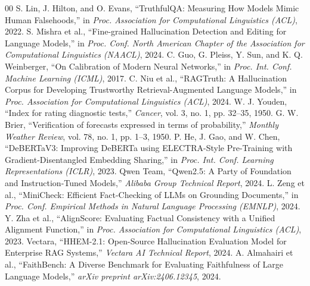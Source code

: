\documentclass[conference]{IEEEtran}
\begin{document}
\begin{thebibliography}{00}
 S. Lin, J. Hilton, and O. Evans, ``TruthfulQA: Measuring How Models Mimic Human Falsehoods,'' in \textit{Proc. Association for Computational Linguistics (ACL)}, 2022.
 S. Mishra et al., ``Fine-grained Hallucination Detection and Editing for Language Models,'' in \textit{Proc. Conf. North American Chapter of the Association for Computational Linguistics (NAACL)}, 2024.
 C. Guo, G. Pleiss, Y. Sun, and K. Q. Weinberger, ``On Calibration of Modern Neural Networks,'' in \textit{Proc. Int. Conf. Machine Learning (ICML)}, 2017.
 C. Niu et al., ``RAGTruth: A Hallucination Corpus for Developing Trustworthy Retrieval-Augmented Language Models,'' in \textit{Proc. Association for Computational Linguistics (ACL)}, 2024.
 W. J. Youden, ``Index for rating diagnostic tests,'' \textit{Cancer}, vol. 3, no. 1, pp. 32--35, 1950.
 G. W. Brier, ``Verification of forecasts expressed in terms of probability,'' \textit{Monthly Weather Review}, vol. 78, no. 1, pp. 1--3, 1950.
 P. He, J. Gao, and W. Chen, ``DeBERTaV3: Improving DeBERTa using ELECTRA-Style Pre-Training with Gradient-Disentangled Embedding Sharing,'' in \textit{Proc. Int. Conf. Learning Representations (ICLR)}, 2023.
 Qwen Team, ``Qwen2.5: A Party of Foundation and Instruction-Tuned Models,'' \textit{Alibaba Group Technical Report}, 2024.
 L. Zeng et al., ``MiniCheck: Efficient Fact-Checking of LLMs on Grounding Documents,'' in \textit{Proc. Conf. Empirical Methods in Natural Language Processing (EMNLP)}, 2024.
 Y. Zha et al., ``AlignScore: Evaluating Factual Consistency with a Unified Alignment Function,'' in \textit{Proc. Association for Computational Linguistics (ACL)}, 2023.
 Vectara, ``HHEM-2.1: Open-Source Hallucination Evaluation Model for Enterprise RAG Systems,'' \textit{Vectara AI Technical Report}, 2024.
 A. Almahairi et al., ``FaithBench: A Diverse Benchmark for Evaluating Faithfulness of Large Language Models,'' \textit{arXiv preprint arXiv:2406.12345}, 2024.
\end{thebibliography}
\end{document}
